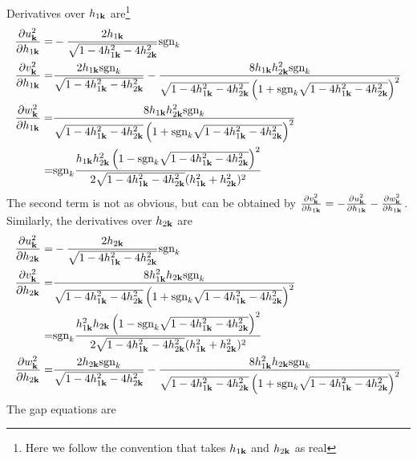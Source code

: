 Derivatives over $h_{1\vk}$ are\footnote{Here we follow the convention that takes $h_{1\vk}$ and $h_{2\vk}$ as real}
\begin{equation}
\begin{split}
\pdiff{u_{\vk}^2}{h_{1\vk}}=&-\frac{2 h_{1\vk}}{\sqrt{1-4 h_{1\vk}^2-4 h_{2\vk}^2}}\sgn_{k}\\
\pdiff{v_{\vk}^2}{h_{1\vk}}=&\frac{2 h_{1\vk}\sgn_k}{\sqrt{1-4 h_{1\vk}^2-4 h_{2\vk}^2}}-\frac{8 h_{1\vk} h_{2\vk}^2\sgn_{k}}{\sqrt{1-4 h_{1\vk}^2-4 h_{2\vk}^2} \left(1+\sgn_{k}\sqrt{1-4 h_{1\vk}^2-4 h_{2\vk}^2}\right)^2}\\
\pdiff{w_{\vk}^2}{h_{1\vk}}=&\frac{8 h_{1\vk} h_{2\vk}^2\sgn_{k}}{\sqrt{1-4 h_{1\vk}^2-4 h_{2\vk}^2} \left(1+\sgn_{k}\sqrt{1-4 h_{1\vk}^2-4 h_{2\vk}^2}\right)^2}\\
=&\sgn_{k}\frac{h_{1\vk} h_{2\vk}^2 \left(1-\sgn_{k}\sqrt{1-4 h_{1\vk}^2-4 h_{2\vk}^2}\right)^2}{2\sqrt{1-4 h_{1\vk}^2-4 h_{2\vk}^2} (h_{1\vk}^2 + h_{2\vk}^2)^2}
\end{split}
\end{equation}
The second term is not as obvious, but can be obtained by $\pdiff{v_{\vk}^2}{h_{1\vk}}=-\pdiff{u_{\vk}^2}{h_{1\vk}}-\pdiff{w_{\vk}^2}{h_{1\vk}}$.   Similarly, the derivatives over $h_{2\vk}$ are
\begin{equation}
\begin{split}
\pdiff{u_{\vk}^2}{h_{2\vk}}=&-\frac{2 h_{2\vk}}{\sqrt{1-4 h_{1\vk}^2-4 h_{2\vk}^2}}\sgn_{k}\\
\pdiff{v_{\vk}^2}{h_{2\vk}}=&\frac{8 h_{1\vk} ^{2}h_{2\vk}\sgn_{k}}{\sqrt{1-4 h_{1\vk}^2-4 h_{2\vk}^2} \left(1+\sgn_{k}\sqrt{1-4 h_{1\vk}^2-4 h_{2\vk}^2}\right)^2}\\
=&\sgn_{k}\frac{h_{1\vk}^{2}h_{2\vk} \left(1-\sgn_{k}\sqrt{1-4 h_{1\vk}^2-4 h_{2\vk}^2}\right)^2}{2\sqrt{1-4 h_{1\vk}^2-4 h_{2\vk}^2} (h_{1\vk}^2 + h_{2\vk}^2)^2}\\
\pdiff{w_{\vk}^2}{h_{2\vk}}=&\frac{2 h_{2\vk}\sgn_k}{\sqrt{1-4 h_{1\vk}^2-4 h_{2\vk}^2}}-\frac{8 h_{1\vk} ^{2}h_{2\vk}\sgn_{k}}{\sqrt{1-4 h_{1\vk}^2-4 h_{2\vk}^2} \left(1+\sgn_{k}\sqrt{1-4 h_{1\vk}^2-4 h_{2\vk}^2}\right)^2}
\end{split}
\end{equation}
The gap equations are 
